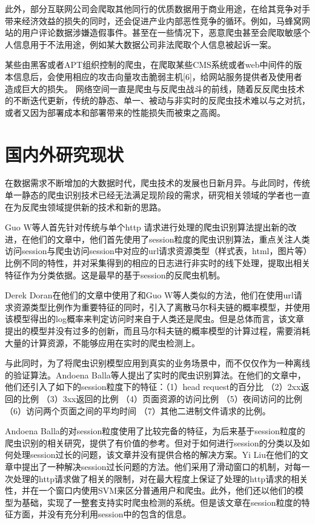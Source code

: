 \documentclass[doctor,privacy,twoside]{buaa_mac}
\begin{document}
此外，部分互联网公司会爬取其他同行的优质数据用于商业用途，在给其竞争对手带来经济效益的损失的同时，还会促进产业内部恶性竞争的循环。例如，马蜂窝网站的用户评论数据涉嫌造假事件。甚至在一些情况下，恶意爬虫甚至会爬取敏感个人信息用于不法用途，例如某大数据公司非法爬取个人信息被起诉一案。

某些由黑客或者APT组织控制的爬虫，在爬取某些CMS系统或者web中间件的版本信息后，会使用相应的攻击向量攻击脆弱主机[6]，给网站服务提供者及使用者造成巨大的损失。
网络空间一直是爬虫与反爬虫战斗的前线，随着反反爬虫技术的不断迭代更新，传统的静态、单一、被动与非实时的反爬虫技术难以与之对抗，或者又因为部署成本和部署带来的性能损失而被束之高阁。

\section{国内外研究现状}
  在数据需求不断增加的大数据时代，爬虫技术的发展也日新月异。与此同时，传统单一静态的爬虫识别技术已经无法满足现阶段的需求，研究相关领域的学者也一直在为反爬虫领域提供新的技术和新的思路。

  Guo W等人首先针对传统与单个http 请求进行处理的爬虫识别算法提出新的改进，在他们的文章中，他们首先使用了session粒度的爬虫识别算法，重点关注人类访问session与爬虫访问session中对应的url请求资源类型（样式表，html，图片等）比例不同的特性，并对采集得到的相应的日志进行非实时的线下处理，提取出相关特征作为分类依据。这是最早的基于session的反爬虫机制。
  
  Derek Doran在他们的文章中使用了和Guo W等人类似的方法，他们在使用url请求资源类型比例作为重要特征的同时，引入了离散马尔科夫链的概率模型，并使用该模型得出的log概率来判定访问时来自于人类还是爬虫。但是总体而言，该文章提出的模型并没有过多的创新，而且马尔科夫链的概率模型的计算过程，需要消耗大量的计算资源，不能够应用在实时的爬虫检测上。
 
   与此同时，为了将爬虫识别模型应用到真实的业务场景中，而不仅仅作为一种离线的验证算法。Andoena Balla等人提出了实时的爬虫识别算法。在他们的文章中，他们还引入了如下的session粒度下的特征：（1）head request的百分比 （2）2xx返回的比例 （3）3xx返回的比例 （4）页面资源的访问比例 （5）夜间访问的比例  （6）访问两个页面之间的平均时间  （7）其他二进制文件请求的比例。
   
   Andoena Balla的对session粒度使用了比较完备的特征，为后来基于session粒度的爬虫识别的相关研究，提供了有价值的参考。但对于如何进行session的分类以及如何处理session过长的问题，该文章并没有提供合格的解决方案。Yi Liu在他们的文章中提出了一种解决session过长问题的方法。他们采用了滑动窗口的机制，对每一次处理的http请求做了相关的限制，对在最大程度上保证了处理的http请求的相关性，并在一个窗口内使用SVM来区分普通用户和爬虫。此外，他们还以他们的模型为基础，实现了一整套支持实时爬虫检测的系统。但是该文章在session粒度的特征方面，并没有充分利用session中的包含的信息。
 
\end{document}
